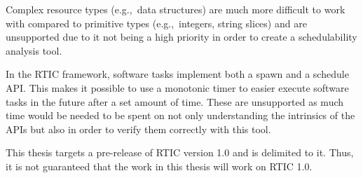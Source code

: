 Complex resource types (e.g.,\ data structures) are much more difficult to work
with compared to primitive types (e.g.,\ integers, string slices) and are
unsupported due to it not being a high priority in order to create a
schedulability analysis tool.

In the RTIC framework, software tasks implement both a spawn and a schedule
API\@. This makes it possible to use a monotonic timer to easier execute software
tasks in the future after a set amount of time. These are unsupported as much
time would be needed to be spent on not only understanding the intrinsics of
the APIs but also in order to verify them correctly with this tool.

This thesis targets a pre-release of RTIC version 1.0 and is delimited to it.
Thus, it is not guaranteed that the work in this thesis will work on RTIC 1.0.

